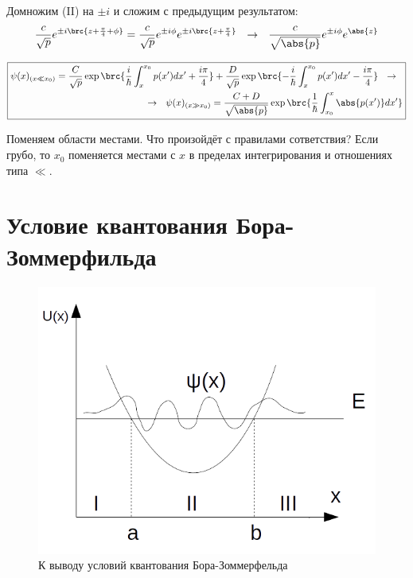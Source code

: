 Домножим (II) на $\pm i$ и сложим с предыдущим результатом:
$$
\frac{c}{\sqrt{p}} e^{\pm i\brc{z+\frac{\pi}{4}+\phi}} = \frac{c}{\sqrt{p}} e^{\pm i \phi} e^{\pm i\brc{z+\frac{\pi}{4}}} ~~\rightarrow~~
\frac{c}{\sqrt{\abs{p}}} e^{\pm i \phi} e^{\abs{z}}
$$

$$
\boxed{
\begin{aligned}
	\psi(x)_{(x \ll x_0)} = \frac{C}{\sqrt{p}} \exp\brc{\frac{i}{\hbar} \int_{x}^{x_0} p(x')dx' + \frac{i\pi}{4}} 
	+ \frac{D}{\sqrt{p}} \exp\brc{-\frac{i}{\hbar} \int_{x}^{x_0} p(x')dx' - \frac{i\pi}{4}} ~~\rightarrow~~ \\
	~~\rightarrow~~ \psi(x)_{(x \gg x_0)} = \frac{C+D}{\sqrt{\abs{p}}} \exp\brc{\frac{1}{\hbar} \int_{x_0}^{x} \abs{p(x')}dx'}
\end{aligned}
}
$$

Поменяем области местами. Что произойдёт с правилами сответствия? Если грубо, то $x_0$ поменяется местами с $x$ в пределах интегрирования и отношениях типа $\ll$.


\section{Условие квантования Бора-Зоммерфильда}

\begin{figure}[h]
\centering
\includegraphics[scale=1]{figs/11_4}
\caption{К выводу условий квантования Бора-Зоммерфельда}
\label{fig:11_4}
\end{figure}

